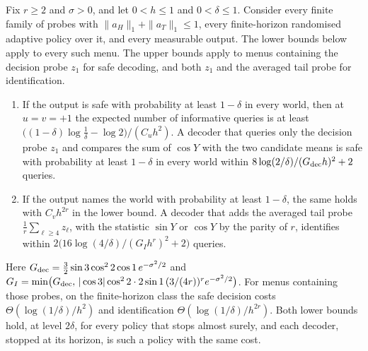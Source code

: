 \begin{theorem}
\label{thm:famrates}
Fix $r\ge2$ and $\sigma>0$, and let $0<h\le1$ and $0<\delta\le1$. Consider every finite family of
probes with $\|a_{H}\|_{1}+\|a_{T}\|_{1}\le1$, every finite-horizon randomised adaptive policy
over it, and every measurable output. The lower bounds below apply to every such menu.
The upper bounds apply to menus containing the decision probe $z_1$ for safe decoding,
and both $z_1$ and the averaged tail probe for identification.
\begin{enumerate}
\item[(i)] If the output is safe with probability at least $1-\delta$ in every world, then at
$u=v=+1$ the expected number of informative queries is at least
$\bigl((1-\delta)\log\frac1\delta-\log2\bigr)/(C_{u}h^{2})$. A decoder that queries only the
decision probe $z_{1}$ and compares the sum of $\cos Y$ with the two candidate means is safe
with probability at least $1-\delta$ in every world within
$8\log(2/\delta)/(G_{\rm dec}h)^{2}+2$ queries.
\item[(ii)] If the output names the world with probability at least $1-\delta$, the same holds
with $C_{v}h^{2r}$ in the lower bound. A decoder that adds the averaged tail probe
$\frac1r\sum_{\ell\ge4}z_{\ell}$, with the statistic $\sin Y$ or $\cos Y$ by the parity of $r$,
identifies within $2\bigl(16\log(4/\delta)/(G_{I}h^{r})^{2}+2\bigr)$ queries.
\end{enumerate}
Here $G_{\rm dec}=\frac32\sin3\cos^{2}2\cos1\,e^{-\sigma^{2}/2}$ and
$G_{I}=\min\bigl(G_{\rm dec},\,|\cos3|\cos^{2}2\cdot2\sin1\,(3/(4r))^{r}e^{-\sigma^{2}/2}\bigr)$.
For menus containing those probes, on the finite-horizon class the safe decision costs $\Theta(\log(1/\delta)/h^{2})$ and
identification $\Theta(\log(1/\delta)/h^{2r})$. Both lower bounds hold, at level $2\delta$, for
every policy that stops almost surely, and each decoder, stopped at its horizon, is such a
policy with the same cost.
\end{theorem}


